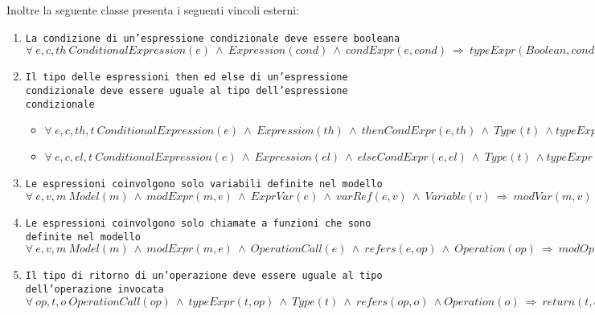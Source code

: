 Inoltre la seguente classe presenta i seguenti vincoli esterni:
\begin{enumerate}
	\item \texttt{La condizione di un'espressione condizionale deve essere booleana} \\
		  $\forall \ e,c,th \ ConditionalExpression(e) \ \land \ Expression(cond) \ \land \ condExpr(e, cond) \ \Rightarrow \ typeExpr(Boolean, cond)$ \\
	\item \texttt{Il tipo delle espressioni then ed else di un'espressione condizionale deve essere uguale al tipo dell'espressione condizionale} \\
		  \begin{itemize}
		  	\item $\forall \ e,c,th,t \ ConditionalExpression(e) \ \land \ Expression(th) \ \land \ thenCondExpr(e, th) \ \land \ Type(t) \ \land typeExpr(t, e) \ \Rightarrow \ typeExpr(t, th)$ \\
		  	\item $\forall \ e,c,el,t \ ConditionalExpression(e) \ \land \ Expression(el) \ \land \ elseCondExpr(e, el) \ \land \ Type(t) \ \land typeExpr(t, e) \ \Rightarrow \ typeExpr(t, th)$ \\
		  \end{itemize}
	\item \texttt{Le espressioni coinvolgono solo variabili definite nel modello} \\
		  $\forall \ e,v,m \ Model(m) \ \land \ modExpr(m, e) \ \land \ ExprVar(e) \ \land \ varRef(e,v) \ \land \ Variable(v) \ \Rightarrow \ modVar(m, v)$ \\
	\item \texttt{Le espressioni coinvolgono solo chiamate a funzioni che sono definite nel modello} \\
		  $\forall \ e,v,m \ Model(m) \ \land \ modExpr(m, e) \ \land \ OperationCall(e) \ \land \ refers(e,op) \ \land \ Operation(op) \ \Rightarrow \ modOp(m, op)$ \\
	\item \texttt{Il tipo di ritorno di un'operazione deve essere uguale al tipo dell'operazione invocata} \\
		  $\forall \ op,t,o \ OperationCall(op) \ \land \ typeExpr(t, op) \ \land \ Type(t) \ \land \ refers(op, o) \ \land Operation(o) \ \Rightarrow \ return(t, o)$ \\
\end{enumerate}